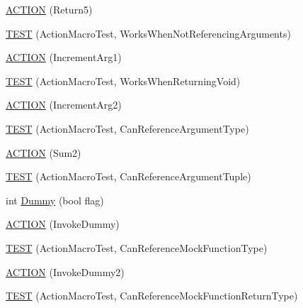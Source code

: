 \begin{DoxyCompactItemize}
\item 
\mbox{\hyperlink{namespacetesting_1_1gmock__generated__actions__test_a1275b0757e9f1caf70fbc23da141acd3}{A\+C\+T\+I\+ON}} (Return5)
\item 
\mbox{\hyperlink{namespacetesting_1_1gmock__generated__actions__test_a6a73da775945f4294d9377b0110bb237}{T\+E\+ST}} (Action\+Macro\+Test, Works\+When\+Not\+Referencing\+Arguments)
\item 
\mbox{\hyperlink{namespacetesting_1_1gmock__generated__actions__test_a960f5a5ca2b6a95ce1f3f1673b90d02d}{A\+C\+T\+I\+ON}} (Increment\+Arg1)
\item 
\mbox{\hyperlink{namespacetesting_1_1gmock__generated__actions__test_accde1673541c5076b0e09b3f1914c9d2}{T\+E\+ST}} (Action\+Macro\+Test, Works\+When\+Returning\+Void)
\item 
\mbox{\hyperlink{namespacetesting_1_1gmock__generated__actions__test_aa2c56f5c6a770b252ebdc27a6d8b613d}{A\+C\+T\+I\+ON}} (Increment\+Arg2)
\item 
\mbox{\hyperlink{namespacetesting_1_1gmock__generated__actions__test_abdfd8146dfbb5a152326a851b13e45cb}{T\+E\+ST}} (Action\+Macro\+Test, Can\+Reference\+Argument\+Type)
\item 
\mbox{\hyperlink{namespacetesting_1_1gmock__generated__actions__test_a108b4ee75c3b13445b7035fd5ecd6d6d}{A\+C\+T\+I\+ON}} (Sum2)
\item 
\mbox{\hyperlink{namespacetesting_1_1gmock__generated__actions__test_a4e2d8b9ac63b2f6dc6d4b17c3a767dee}{T\+E\+ST}} (Action\+Macro\+Test, Can\+Reference\+Argument\+Tuple)
\item 
int \mbox{\hyperlink{namespacetesting_1_1gmock__generated__actions__test_ab91824b86c842e024337b6de45eb8cdc}{Dummy}} (bool flag)
\item 
\mbox{\hyperlink{namespacetesting_1_1gmock__generated__actions__test_ae6806220035fcf097362dd736db4b03b}{A\+C\+T\+I\+ON}} (Invoke\+Dummy)
\item 
\mbox{\hyperlink{namespacetesting_1_1gmock__generated__actions__test_a1d3b8bb25c79d7e2167234f87935ea1e}{T\+E\+ST}} (Action\+Macro\+Test, Can\+Reference\+Mock\+Function\+Type)
\item 
\mbox{\hyperlink{namespacetesting_1_1gmock__generated__actions__test_a9f274ffcf4211cb03b4390cb0cc1ef1c}{A\+C\+T\+I\+ON}} (Invoke\+Dummy2)
\item 
\mbox{\hyperlink{namespacetesting_1_1gmock__generated__actions__test_a384a114235b474bb4318754e0d16f559}{T\+E\+ST}} (Action\+Macro\+Test, Can\+Reference\+Mock\+Function\+Return\+Type)
\item 

\end{DoxyCompactItemize}
